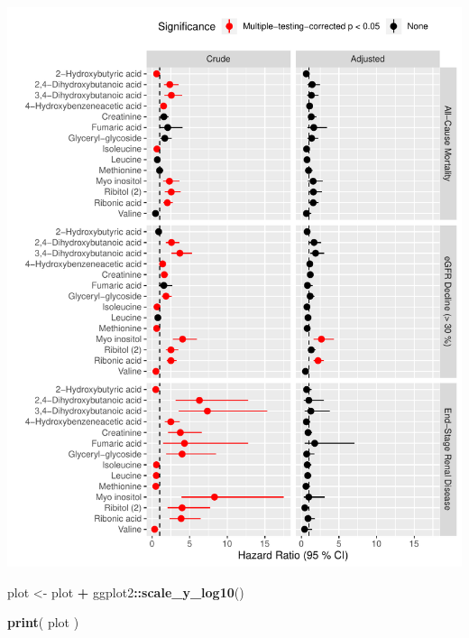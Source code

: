 \documentclass[]{article}
\newenvironment{Shaded}{\begin{snugshade}}{\end{snugshade}}
\newcommand{\KeywordTok}[1]{\textcolor[rgb]{0.13,0.29,0.53}{\textbf{#1}}}
\newcommand{\NormalTok}[1]{#1}
\newcommand{\OperatorTok}[1]{\textcolor[rgb]{0.81,0.36,0.00}{\textbf{#1}}}
\newcommand{\StringTok}[1]{\textcolor[rgb]{0.31,0.60,0.02}{#1}}
\begin{document}
\includegraphics{0033_PROFIL--Metabolomics_files/figure-latex/Surv-Compilation-Combined-From-3-Forest-1.pdf}

\begin{Shaded}
\begin{Highlighting}[]
\NormalTok{plot <-}\StringTok{ }\NormalTok{plot }\OperatorTok{+}\StringTok{ }\NormalTok{ggplot2}\OperatorTok{::}\KeywordTok{scale_y_log10}\NormalTok{()}

\KeywordTok{print}\NormalTok{( plot )}
\end{Highlighting}
\end{Shaded}
\end{document}
